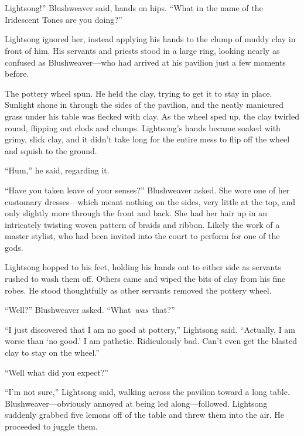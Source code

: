 \chapter{}

Lightsong!” Blushweaver said, hands on hips. “What in the name of the Iridescent Tones are you doing?”

Lightsong ignored her, instead applying his hands to the clump of muddy clay in front of him. His servants and priests stood in a large ring, looking nearly as confused as Blushweaver—who had arrived at his pavilion just a few moments before.

The pottery wheel spun. He held the clay, trying to get it to stay in place. Sunlight shone in through the sides of the pavilion, and the neatly manicured grass under his table was flecked with clay. As the wheel sped up, the clay twirled round, flipping out clods and clumps. Lightsong’s hands became soaked with grimy, slick clay, and it didn’t take long for the entire mess to flip off the wheel and squish to the ground.

“Hum,” he said, regarding it.

“Have you taken leave of your senses?” Blushweaver asked. She wore one of her customary dresses—which meant nothing on the sides, very little at the top, and only slightly more through the front and back. She had her hair up in an intricately twisting woven pattern of braids and ribbon. Likely the work of a master stylist, who had been invited into the court to perform for one of the gods.

Lightsong hopped to his feet, holding his hands out to either side as servants rushed to wash them off. Others came and wiped the bits of clay from his fine robes. He stood thoughtfully as other servants removed the pottery wheel.

“Well?” Blushweaver asked. “What~\textit{was}~that?”

“I just discovered that I am no good at pottery,” Lightsong said. “Actually, I am worse than ‘no good.’ I am pathetic. Ridiculously bad. Can’t even get the blasted clay to stay on the wheel.”

“Well what did you expect?”

“I’m not sure,” Lightsong said, walking across the pavilion toward a long table. Blushweaver—obviously annoyed at being led along—followed. Lightsong suddenly grabbed five lemons off of the table and threw them into the air. He proceeded to juggle them.

